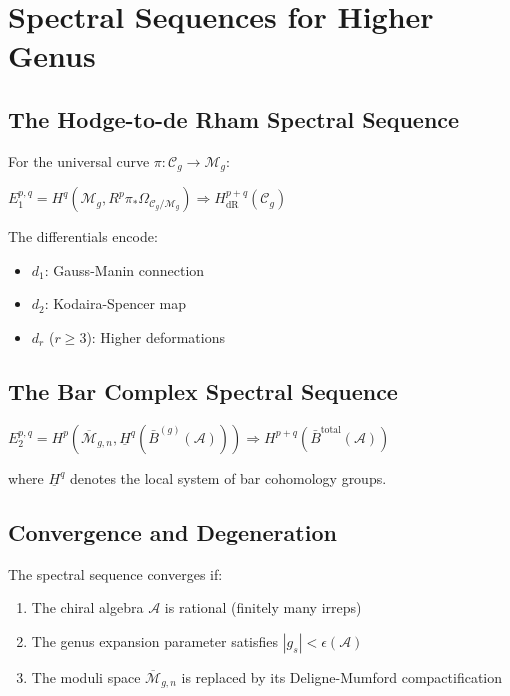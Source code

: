 \section{Spectral Sequences for Higher Genus}

\subsection{The Hodge-to-de Rham Spectral Sequence}

For the universal curve $\pi: \mathcal{C}_g \to \mathcal{M}_g$:

$E_1^{p,q} = H^q(\mathcal{M}_g, R^p\pi_*\Omega_{\mathcal{C}_g/\mathcal{M}_g}) \Rightarrow H^{p+q}_{\text{dR}}(\mathcal{C}_g)$

The differentials encode:
\begin{itemize}
\item $d_1$: Gauss-Manin connection
\item $d_2$: Kodaira-Spencer map  
\item $d_r$ ($r \geq 3$): Higher deformations
\end{itemize}

\subsection{The Bar Complex Spectral Sequence}

$E_2^{p,q} = H^p(\overline{\mathcal{M}}_{g,n}, \underline{H}^q(\bar{B}^{(g)}(\mathcal{A}))) \Rightarrow H^{p+q}(\bar{B}^{\text{total}}(\mathcal{A}))$

where $\underline{H}^q$ denotes the local system of bar cohomology groups.

\subsection{Convergence and Degeneration}

\begin{theorem}
The spectral sequence converges if:
\begin{enumerate}
\item The chiral algebra $\mathcal{A}$ is rational (finitely many irreps)
\item The genus expansion parameter satisfies $|g_s| < \epsilon(\mathcal{A})$
\item The moduli space $\overline{\mathcal{M}}_{g,n}$ is replaced by its Deligne-Mumford compactification
\end{enumerate}
\end{theorem}

